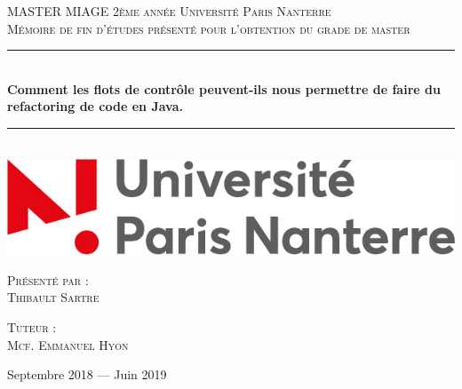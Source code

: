 \documentclass[a4paper,twoside,12pt,openright]{report}
\newcommand{\HRule}{\rule{\linewidth}{0.5mm}}
\begin{document}
\begin{titlepage}
  \begin{sffamily}
  \begin{center}

    \textsc{\LARGE MASTER MIAGE 2ème année \linebreak Université Paris Nanterre}\\[2cm]

    \textsc{\Large Mémoire de fin d’études présenté pour l’obtention du grade de master}\\[1.5cm]

    \HRule \\[0.4cm]
    { \huge \bfseries Comment les flots de contrôle peuvent-ils nous permettre de faire du refactoring de code en Java. \\[0.4cm] }

    \HRule \\[2cm]
    \includegraphics[scale=0.40]{image/univ.jpg}
    \hspace{2cm}
    
    \vfill
  \begin{minipage}{0.4\textwidth}
      \begin{flushleft} \large
        \textsc{Présenté par :}\\ \textsc{Thibault Sartre}\\
      \end{flushleft}
    \end{minipage}
    \begin{minipage}{0.4\textwidth}
      \begin{flushright} \large
        \textsc{Tuteur :}\\ \textsc{Mcf. Emmanuel Hyon}\\
      \end{flushright}
    \end{minipage}
    \vfill
    {\large Septembre 2018 — Juin 2019}
  \end{center}
  \end{sffamily}
\end{titlepage}
\renewcommand{\contentsname}{Sommaire}
\tableofcontents{}
\end{document}
